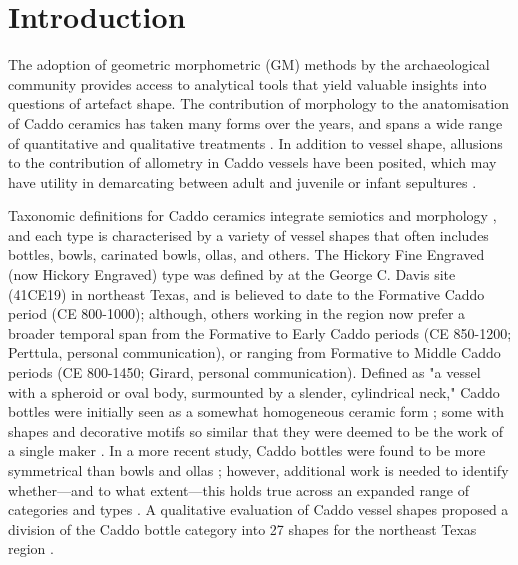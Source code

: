 \documentclass[review]{elsarticle}
\begin{document}
\linenumbers

\section{Introduction} 

The adoption of geometric morphometric (GM) methods by the archaeological community provides access to analytical tools that yield valuable insights into questions of artefact shape. The contribution of morphology to the anatomisation of Caddo ceramics has taken many forms over the years, and spans a wide range of quantitative \citep{RN4769,RN4773,RN11521x,RN11801,RN11716,RN1994} and qualitative treatments \citep{RN2518,RN4774,RN11636}. In addition to vessel shape, allusions to the contribution of allometry in Caddo vessels have been posited, which may have utility in demarcating between adult and juvenile or infant sepultures \citep{RN2917}.

Taxonomic definitions for Caddo ceramics integrate semiotics and morphology \citep{RN4302,RN5066}, and each type is characterised by a variety of vessel shapes that often includes bottles, bowls, carinated bowls, ollas, and others. The Hickory Fine Engraved (now Hickory Engraved) type was defined by \citet{RN800} at the George C. Davis site (41CE19) in northeast Texas, and is believed to date to the Formative Caddo period (CE 800-1000); although, others working in the region now prefer a broader temporal span from the Formative to Early Caddo periods (CE 850-1200; Perttula, personal communication), or ranging from Formative to Middle Caddo periods (CE 800-1450; Girard, personal communication). Defined as "a vessel with a spheroid or oval body, surmounted by a slender, cylindrical neck," Caddo bottles were initially seen as a somewhat homogeneous ceramic form \citep[187]{RN2151}; some with shapes and decorative motifs so similar that they were deemed to be the work of a single maker \citep[188]{RN2151}. In a more recent study, Caddo bottles were found to be more symmetrical than bowls and ollas \citep{RN11521x}; however, additional work is needed to identify whether---and to what extent---this holds true across an expanded range of categories and types \citep{RN11716}. A qualitative evaluation of Caddo vessel shapes proposed a division of the Caddo bottle category into 27 shapes for the northeast Texas region \citep[Figure 2]{RN11636}.
\end{document}
